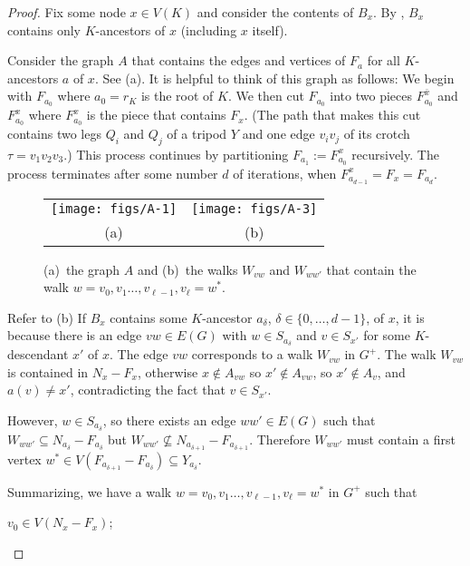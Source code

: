 \documentclass{patmorin}
\begin{document}
\begin{proof}
  Fix some node $x\in V(K)$ and consider the contents of $B_x$.  By , $B_x$ contains only $K$-ancestors of $x$ (including $x$ itself). 
  
  Consider the graph $A$ that contains the edges and vertices of $F_{a}$ for all $K$-ancestors $a$ of $x$. See (a).  It is helpful to think of this graph as follows:  We begin with $F_{a_0}$ where $a_0=r_K$ is the root of $K$.  We then cut $F_{a_0}$ into two pieces $F^{\bar{x}}_{a_0}$ and $F^x_{a_0}$ where $F^x_{a_0}$ is the piece that contains $F_x$. (The path that makes this cut contains two legs $Q_i$ and $Q_j$ of a tripod $Y$ and one edge $v_iv_j$ of its crotch $\tau=v_1v_2v_3$.)  This process continues by partitioning $F_{a_1}:=F^x_{a_0}$ recursively.  The process terminates after some number $d$ of iterations, when $F^x_{a_{d-1}}=F_x=F_{a_d}$.

  \begin{figure}
    \begin{center}
      \begin{tabular}{cc}
        \texttt{[image: figs/A-1]} &
        \texttt{[image: figs/A-3]} \\ (a) & (b)
      \end{tabular}
    \end{center}
    \caption{(a)~the graph $A$ and (b)~the walks $W_{vw}$ and $W_{ww'}$ that contain the walk $w=v_0,v_1\ldots,v_{\ell-1},v_\ell=w^*$.}
  \end{figure}

  Refer to (b)
  If $B_x$ contains some $K$-ancestor $a_\delta$, $\delta\in\{0,\ldots,d-1\}$, of $x$, it is because there is an edge $vw\in E(G)$ with $w\in S_{a_\delta}$ and $v\in S_{x'}$ for some $K$-descendant $x'$ of $x$.  The edge $vw$ corresponds to a walk $W_{vw}$ in $G^+$. The walk $W_{vw}$ is contained in $N_x-F_x$, otherwise $x\not\in A_{vw}$ so $x'\not\in A_{vw}$, so $x'\not\in A_v$, and $a(v)\neq x'$, contradicting the fact that $v\in S_{x'}$.
  
  However, $w\in S_{a_\delta}$, so there exists an edge $ww'\in E(G)$ such that $W_{ww'}\subseteq N_{a_\delta}-F_{a_\delta}$ but $W_{ww'}\not\subseteq N_{a_{\delta+1}}-F_{a_{\delta+1}}$.  Therefore $W_{ww'}$ must contain a first vertex $w^*\in V(F_{a_{\delta+1}}-F_{a_\delta})\subseteq Y_{a_\delta}$.

  Summarizing, we have a walk $w=v_0,v_1\ldots,v_{\ell-1},v_\ell=w^*$ in $G^+$ such that
  \begin{compactenum}[(i)]
    \item $v_0\in V(N_x-F_x)$;
    

\end{compactenum}
\end{proof}
\end{document}
